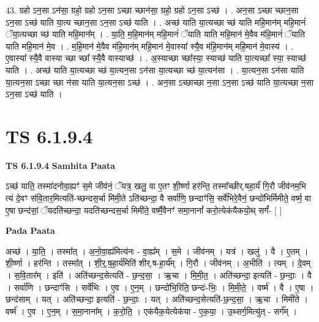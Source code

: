\documentclass[17pt]{extarticle}
\begin{document}
43. ग्रहो ऽन॒सा ऽन॑सा॒ ग्रहो॒ ग्रहो ऽन॒सा ऽच्छा च्छान॑सा॒ ग्रहो॒ ग्रहो ऽन॒सा ऽच्छ॑ । . अन॒सा ऽच्छा च्छान॒सा ऽन॒सा ऽच्छ॑ याति या॒त्य च्छान॒सा ऽन॒सा ऽच्छ॑ याति । . अच्छ॑ याति या॒त्यच्छा च्छ॑ याति महि॒मान॑म् महि॒मानं॑ ॅया॒त्यच्छा च्छ॑ याति महि॒मान᳚म् । . या॒ति॒ म॒हि॒मान॑म् महि॒मानं॑ ॅयाति याति महि॒मान॑ मे॒वैव म॑हि॒मानं॑ ॅयाति याति महि॒मान॑ मे॒व । . म॒हि॒मान॑ मे॒वैव म॑हि॒मान॑म् महि॒मान॑ मे॒वास्या᳚ स्यै॒व म॑हि॒मान॑म् महि॒मान॑ मे॒वास्य॑ । . ए॒वास्या᳚ स्यै॒वै वास्या च्छा च्छा᳚ स्यै॒वै वास्याच्छ॑ । . अ॒स्याच्छा च्छा᳚स्या॒ स्याच्छ॑ याति या॒त्यच्छा᳚ स्या॒ स्याच्छ॑ याति । . अच्छ॑ याति या॒त्यच्छा च्छ॑ या॒त्यन॒सा ऽन॑सा या॒त्यच्छा च्छ॑ या॒त्यन॑सा । . या॒त्यन॒सा ऽन॑सा याति या॒त्यन॒सा ऽच्छा च्छा न॑सा याति या॒त्यन॒सा ऽच्छ॑ । . अन॒सा ऽच्छाच्छा न॒सा ऽन॒सा ऽच्छ॑ याति या॒त्यच्छा न॒सा ऽन॒सा ऽच्छ॑ याति । \newline
\pagebreak
{}

\section{ TS 6.1.9.4 }

\textbf{TS 6.1.9.4 } \newline
\textbf{Samhita Paata} \newline

ऽच्छ॑ याति॒ तस्मा॑दनोवा॒ह्यꣳ॑ स॒मे जीव॑नं॒ ॅयत्र॒ खलु॒ वा ए॒तꣳ शी॒र्ष्णा हर॑न्ति॒ तस्मा᳚च्छीर्.षहा॒र्यं॑ गि॒रौ जीव॑नम॒भि त्यं दे॒वꣳ स॑वि॒तार॒मित्यति॑-च्छन्दस॒र्चा मि॑मी॒ते ऽति॑च्छन्दा॒ वै सर्वा॑णि॒ छन्दाꣳ॑सि॒ सर्वे॑भिरे॒वैनं॒ छन्दो॑भिर्मिमीते॒ वर्ष्म॒ वा ए॒षा छन्द॑सां॒ ॅयदति॑च्छन्दा॒ यदति॑च्छन्दस॒र्चा मिमी॑ते॒ वर्ष्मै॒वैनꣳ॑ समा॒नानां᳚ करो॒त्येक॑यैकयो॒थ् सर्गं॑- [  ] \newline

\textbf{Pada Paata} \newline

अच्छ॑ । या॒ति॒ । तस्मा᳚त् । अ॒नो॒वा॒ह्य॑मित्य॑नः - वा॒ह्य᳚म् । स॒मे । जीव॑नम् । यत्र॑ । खलु॑ । वै । ए॒तम् । शी॒र्ष्णा । हर॑न्ति । तस्मा᳚त् । शी॒र्॒.ष॒हा॒र्य॑मिति॑ शीर्.ष-हा॒र्य᳚म् । गि॒रौ । जीव॑नम् । अ॒भीति॑ । त्यम् । दे॒वम् । स॒वि॒तार᳚म् । इति॑ । अति॑च्छन्द॒सेत्यति॑ - छ॒न्द॒सा॒ । ऋ॒चा । मि॒मी॒त॒ । अति॑च्छन्दा॒ इत्यति॑ - छ॒न्दाः॒ । वै । सर्वा॑णि । छन्दाꣳ॑सि । सर्वे॑भिः । ए॒व । ए॒न॒म् । छन्दो॑भि॒रिति॒ छन्दः॑-भिः॒ । मि॒मी॒ते॒ । वर्ष्म॑ । वै । ए॒षा । छन्द॑साम् । यत् । अति॑च्छन्दा॒ इत्यति॑ - छ॒न्दाः॒ । यत् । अति॑च्छन्द॒सेत्यति॑-छ॒न्द॒सा॒ । ऋ॒चा । मिमी॑ते । वर्ष्म॑ । ए॒व । ए॒न॒म् । स॒मा॒नाना᳚म् । क॒रो॒ति॒ । एक॑यैक॒येत्येक॑या - ए॒क॒या॒ । उ॒थ्सर्ग॒मित्यु॑त् - सर्ग᳚म् ।  \newline
\end{document}
